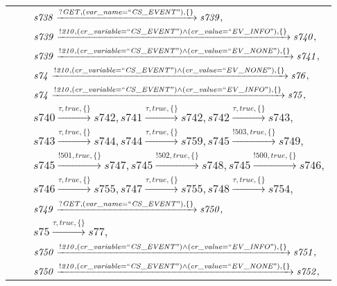 \begin{tabular}{lcp{350px}}
& & $\mathit{s738}\xrightarrow{\mathit{?GET}, \mathit{(var\_name = ``CS\_EVENT")}, \{\}}\mathit{s739},$ \\
& & $\mathit{s739}\xrightarrow{\mathit{!210}, \mathit{(cr\_variable = ``CS\_EVENT") \land (cr\_value = ``EV\_INFO")}, \{\}}\mathit{s740},$ \\
& & $\mathit{s739}\xrightarrow{\mathit{!210}, \mathit{(cr\_variable = ``CS\_EVENT") \land (cr\_value = ``EV\_NONE")}, \{\}}\mathit{s741},$ \\
& & $\mathit{s74}\xrightarrow{\mathit{!210}, \mathit{(cr\_variable = ``CS\_EVENT") \land (cr\_value = ``EV\_NONE")}, \{\}}\mathit{s76},$ \\
& & $\mathit{s74}\xrightarrow{\mathit{!210}, \mathit{(cr\_variable = ``CS\_EVENT") \land (cr\_value = ``EV\_INFO")}, \{\}}\mathit{s75},$ \\
& & $\mathit{s740}\xrightarrow{\mathit{\tau}, \mathit{true}, \{\}}\mathit{s742},\mathit{s741}\xrightarrow{\mathit{\tau}, \mathit{true}, \{\}}\mathit{s742},\mathit{s742}\xrightarrow{\mathit{\tau}, \mathit{true}, \{\}}\mathit{s743},$ \\
& & $\mathit{s743}\xrightarrow{\mathit{\tau}, \mathit{true}, \{\}}\mathit{s744},\mathit{s744}\xrightarrow{\mathit{\tau}, \mathit{true}, \{\}}\mathit{s759},\mathit{s745}\xrightarrow{\mathit{!503}, \mathit{true}, \{\}}\mathit{s749},$ \\
& & $\mathit{s745}\xrightarrow{\mathit{!501}, \mathit{true}, \{\}}\mathit{s747},\mathit{s745}\xrightarrow{\mathit{!502}, \mathit{true}, \{\}}\mathit{s748},\mathit{s745}\xrightarrow{\mathit{!500}, \mathit{true}, \{\}}\mathit{s746},$ \\
& & $\mathit{s746}\xrightarrow{\mathit{\tau}, \mathit{true}, \{\}}\mathit{s755},\mathit{s747}\xrightarrow{\mathit{\tau}, \mathit{true}, \{\}}\mathit{s755},\mathit{s748}\xrightarrow{\mathit{\tau}, \mathit{true}, \{\}}\mathit{s754},$ \\
& & $\mathit{s749}\xrightarrow{\mathit{?GET}, \mathit{(var\_name = ``CS\_EVENT")}, \{\}}\mathit{s750},$ \\
& & $\mathit{s75}\xrightarrow{\mathit{\tau}, \mathit{true}, \{\}}\mathit{s77},$ \\
& & $\mathit{s750}\xrightarrow{\mathit{!210}, \mathit{(cr\_variable = ``CS\_EVENT") \land (cr\_value = ``EV\_INFO")}, \{\}}\mathit{s751},$ \\
& & $\mathit{s750}\xrightarrow{\mathit{!210}, \mathit{(cr\_variable = ``CS\_EVENT") \land (cr\_value = ``EV\_NONE")}, \{\}}\mathit{s752},$ \\

\end{tabular}
